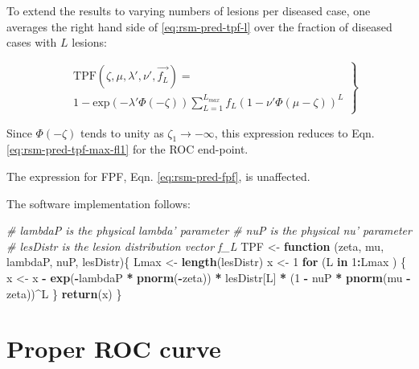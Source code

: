 \documentclass[
]{book}
\newenvironment{Shaded}{\begin{snugshade}}{\end{snugshade}}
\newcommand{\CommentTok}[1]{\textcolor[rgb]{0.56,0.35,0.01}{\textit{#1}}}
\newcommand{\ControlFlowTok}[1]{\textcolor[rgb]{0.13,0.29,0.53}{\textbf{#1}}}
\newcommand{\DecValTok}[1]{\textcolor[rgb]{0.00,0.00,0.81}{#1}}
\newcommand{\KeywordTok}[1]{\textcolor[rgb]{0.13,0.29,0.53}{\textbf{#1}}}
\newcommand{\NormalTok}[1]{#1}
\newcommand{\OperatorTok}[1]{\textcolor[rgb]{0.81,0.36,0.00}{\textbf{#1}}}
\newcommand{\StringTok}[1]{\textcolor[rgb]{0.31,0.60,0.02}{#1}}
\begin{document}
To extend the results to varying numbers of lesions per diseased case, one averages the right hand side of \eqref{eq:rsm-pred-tpf-l} over the fraction of diseased cases with \(L\) lesions:

\begin{equation}
\left.
\begin{aligned}
& \text{TPF}\left (\zeta , \mu, \lambda', \nu', \overrightarrow{f_L} \right ) =  \\
& 1 - \text{exp}\left ( -\lambda' \Phi \left ( -\zeta \right )\right ) 
\sum_{L=1}^{L_{max}} f_L  \left ( 1 - \nu' \Phi \left ( \mu -\zeta \right ) \right )^L 
\end{aligned}
\right \}
\label{eq:rsm-pred-tpf}
\end{equation}

Since \(\Phi \left ( -\zeta \right )\) tends to unity as \(\zeta_1 \rightarrow -\infty\), this expression reduces to Eqn. \eqref{eq:rsm-pred-tpf-max-fl1} for the ROC end-point.

The expression for FPF, Eqn. \eqref{eq:rsm-pred-fpf}, is unaffected.

The software implementation follows:

\begin{Shaded}
\begin{Highlighting}[]
\CommentTok{# lambdaP is the physical lambda' parameter}
\CommentTok{# nuP is the physical nu' parameter}
\CommentTok{# lesDistr is the lesion distribution vector f_L}
\NormalTok{TPF <-}\StringTok{ }\ControlFlowTok{function}\NormalTok{ (zeta, mu, lambdaP, nuP, lesDistr)\{}
\NormalTok{  Lmax <-}\StringTok{ }\KeywordTok{length}\NormalTok{(lesDistr)}
\NormalTok{  x <-}\StringTok{ }\DecValTok{1}
  \ControlFlowTok{for}\NormalTok{ (L }\ControlFlowTok{in} \DecValTok{1}\OperatorTok{:}\NormalTok{Lmax ) \{}
\NormalTok{    x <-}\StringTok{ }\NormalTok{x }\OperatorTok{-}\StringTok{ }\KeywordTok{exp}\NormalTok{(}\OperatorTok{-}\NormalTok{lambdaP }\OperatorTok{*}\StringTok{ }\KeywordTok{pnorm}\NormalTok{(}\OperatorTok{-}\NormalTok{zeta)) }\OperatorTok{*}\StringTok{ }\NormalTok{lesDistr[L] }\OperatorTok{*}\StringTok{ }\NormalTok{(}\DecValTok{1} \OperatorTok{-}\StringTok{ }\NormalTok{nuP }\OperatorTok{*}\StringTok{ }\KeywordTok{pnorm}\NormalTok{(mu }\OperatorTok{-}\StringTok{ }\NormalTok{zeta))}\OperatorTok{^}\NormalTok{L}
\NormalTok{  \}}
  \KeywordTok{return}\NormalTok{(x)}
\NormalTok{\}}
\end{Highlighting}
\end{Shaded}

\hypertarget{rsm-pred-roc-curve-proper}{%
\section{Proper ROC curve}\label{rsm-pred-roc-curve-proper}}
\end{document}
